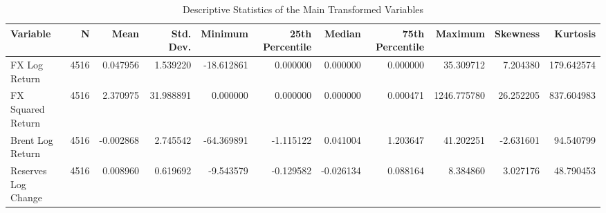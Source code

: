 \begin{table}
\caption{Descriptive Statistics of the Main Transformed Variables}
\label{tab:4.1}
\begin{tabular}{lrrrrrrrrrr}
\toprule
Variable & N & Mean & Std. Dev. & Minimum & 25th Percentile & Median & 75th Percentile & Maximum & Skewness & Kurtosis \\
\midrule
FX Log Return & 4516 & 0.047956 & 1.539220 & -18.612861 & 0.000000 & 0.000000 & 0.000000 & 35.309712 & 7.204380 & 179.642574 \\
FX Squared Return & 4516 & 2.370975 & 31.988891 & 0.000000 & 0.000000 & 0.000000 & 0.000471 & 1246.775780 & 26.252205 & 837.604983 \\
Brent Log Return & 4516 & -0.002868 & 2.745542 & -64.369891 & -1.115122 & 0.041004 & 1.203647 & 41.202251 & -2.631601 & 94.540799 \\
Reserves Log Change & 4516 & 0.008960 & 0.619692 & -9.543579 & -0.129582 & -0.026134 & 0.088164 & 8.384860 & 3.027176 & 48.790453 \\
\bottomrule
\end{tabular}
\end{table}
